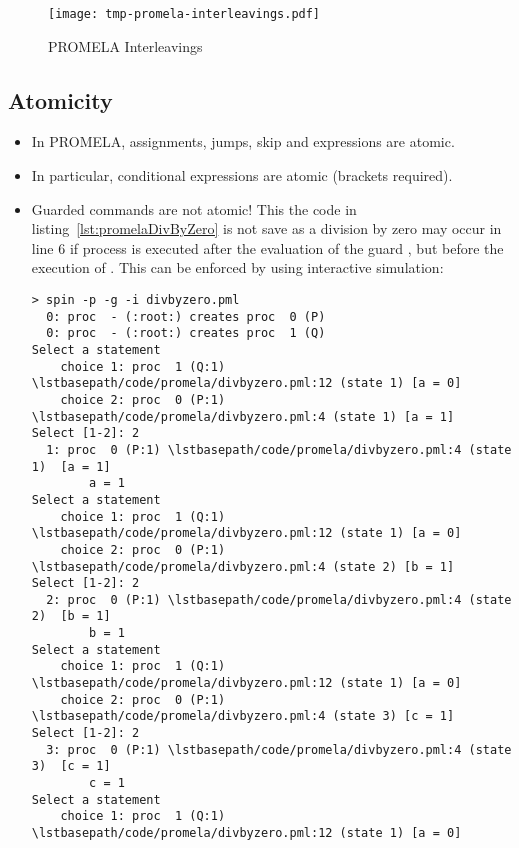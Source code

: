 				\begin{figure}
					\centering
					\texttt{[image: tmp-promela-interleavings.pdf]}
					\caption{PROMELA Interleavings}
					\label{fig:promelaInterleaving}
				\end{figure}

		\subsection{Atomicity}
			
			\begin{itemize}
				\item In PROMELA, assignments, jumps, skip and expressions are atomic.
				\item In particular, conditional expressions  are atomic (brackets required).
				\item Guarded commands are not atomic! This the code in listing~\ref{lst:promelaDivByZero} is not save as a division by zero may occur in line 6 if process  is executed after the evaluation of the guard , but before the execution of . This can be enforced by using interactive simulation:
					\begin{lstlisting}[numbers = none]
> spin -p -g -i divbyzero.pml
  0: proc  - (:root:) creates proc  0 (P)
  0: proc  - (:root:) creates proc  1 (Q)
Select a statement
	choice 1: proc  1 (Q:1) \lstbasepath/code/promela/divbyzero.pml:12 (state 1) [a = 0]
	choice 2: proc  0 (P:1) \lstbasepath/code/promela/divbyzero.pml:4 (state 1) [a = 1]
Select [1-2]: 2
  1: proc  0 (P:1) \lstbasepath/code/promela/divbyzero.pml:4 (state 1)	[a = 1]
		a = 1
Select a statement
	choice 1: proc  1 (Q:1) \lstbasepath/code/promela/divbyzero.pml:12 (state 1) [a = 0]
	choice 2: proc  0 (P:1) \lstbasepath/code/promela/divbyzero.pml:4 (state 2) [b = 1]
Select [1-2]: 2
  2: proc  0 (P:1) \lstbasepath/code/promela/divbyzero.pml:4 (state 2)	[b = 1]
		b = 1
Select a statement
	choice 1: proc  1 (Q:1) \lstbasepath/code/promela/divbyzero.pml:12 (state 1) [a = 0]
	choice 2: proc  0 (P:1) \lstbasepath/code/promela/divbyzero.pml:4 (state 3) [c = 1]
Select [1-2]: 2
  3: proc  0 (P:1) \lstbasepath/code/promela/divbyzero.pml:4 (state 3)	[c = 1]
		c = 1
Select a statement
	choice 1: proc  1 (Q:1) \lstbasepath/code/promela/divbyzero.pml:12 (state 1) [a = 0]

\end{lstlisting}
\end{itemize}
